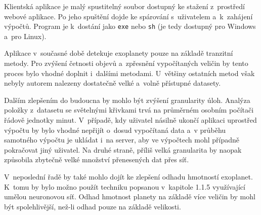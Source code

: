 \documentclass[a4paper,12pt]{article}
\def\code#1{\texttt{#1}}
\begin{document}
{{{{{{{{{{{{{Klientská aplikace je malý spustitelný soubor dostupný ke stažení z~prostředí webové aplikace. Po jeho spuštění dojde ke spárování s~uživatelem a~k~zahájení výpočtů. Program je k~dostání jako \code{exe} nebo \code{sh} (je tedy dostupný pro Windows a~pro Linux).

Aplikace v~současné době detekuje exoplanety pouze na základě tranzitní metody. Pro zvýšení četnosti objevů a~zpřesnění vypočítaných veličin by tento proces bylo vhodné doplnit i~dalšími metodami. U~většiny ostatních metod však nebyly autorem nalezeny dostatečně velké a~volně přístupné datasety.

Dalším zlepšením do budoucna by mohlo být zvýšení granularity úloh. Analýza položky z~datasetu se světelnými křivkami trvá na průměrném osobním počítači řádově jednotky minut. V~případě, kdy uživatel násilně ukončí aplikaci uprostřed výpočtu by bylo vhodné nepřijít o~dosud vypočítaná data a~v průběhu samotného výpočtu je ukládat i~na server, aby ve výpočtech mohl případně pokračovat jiný uživatel. Na druhé straně, příliš velká granularita by naopak způsobila zbytečně velké množství přenesených dat přes síť.

V~neposlední řadě by také mohlo dojít ke zlepšení odhadu hmotností exoplanet. K~tomu by bylo možno použít techniku popsanou v~kapitole 1.1.5 využívající umělou neuronovou síť. Odhad hmotnost planety na základě více veličin by mohl být spolehlivější, než-li odhad pouze na základě velikosti.



\begin{thebibliography}{99}	%






\end{thebibliography}}}}}}}}}}}}}}
\end{document}
